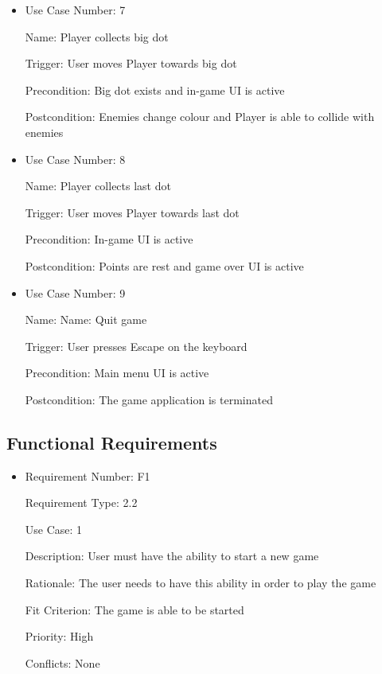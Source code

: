 \documentclass[12pt, titlepage]{article}
\begin{document}
\begin{itemize}
\item
Use Case Number: 7

Name: Player collects big dot

Trigger: User moves Player towards big dot

Precondition: Big dot exists and in-game UI is active

Postcondition: Enemies change colour and Player is able to collide with enemies
\end{itemize}

\begin{itemize}
\item
Use Case Number: 8

Name: Player collects last dot

Trigger: User moves Player towards last dot

Precondition: In-game UI is active

Postcondition: Points are rest and game over UI is active
\end{itemize}

\begin{itemize}
\item
Use Case Number: 9

Name: Name: Quit game

Trigger: User presses Escape on the keyboard

Precondition: Main menu UI is active

Postcondition: The game application is terminated
\end{itemize}


\subsection{Functional Requirements}

\begin{itemize}
\item
Requirement Number: F1

Requirement Type: 2.2

Use Case: 1

Description: User must have the ability to start a new game

Rationale: The user needs to have this ability in order to play the game

Fit Criterion: The game is able to be started

Priority: High

Conflicts: None
\end{itemize}
\end{document}
